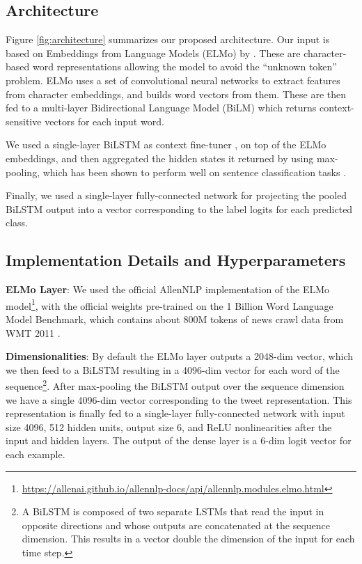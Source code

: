 \documentclass[11pt,a4paper]{article}
\begin{document}
\subsection{Architecture}

Figure \ref{fig:architecture} summarizes our proposed architecture. Our input is based on Embeddings from Language Models (ELMo) by \citet{peters2018deep}. These are character-based word representations allowing the model to avoid the ``unknown token'' problem. ELMo uses a set of convolutional neural networks to extract features from character embeddings, and builds word vectors from them. These are then fed to a multi-layer Bidirectional Language Model (BiLM) which returns context-sensitive vectors for each input word. 

We used a single-layer BiLSTM as context fine-tuner \cite{graves2005framewise, graves2013speech}, on top of the ELMo embeddings, and then aggregated the hidden states it returned by using max-pooling, which has been shown to perform well on sentence classification tasks \cite{conneau2017supervised}.

Finally, we used a single-layer fully-connected network for projecting the pooled BiLSTM output into a vector corresponding to the label logits for each predicted class.

\subsection{Implementation Details and Hyperparameters}

\hspace{\parindent} \textbf{ELMo Layer}: We used the official AllenNLP implementation of the ELMo model\footnote{\tiny\url{https://allenai.github.io/allennlp-docs/api/allennlp.modules.elmo.html}}, with the official weights pre-trained on the 1 Billion Word Language Model Benchmark, which contains about 800M tokens of news crawl data from WMT 2011 \cite{Chelba2014}.

\textbf{Dimensionalities}: By default the ELMo layer outputs a 2048-dim vector, which we then feed to a BiLSTM resulting in a 4096-dim vector for each word of the sequence\footnote{A BiLSTM is composed of two separate LSTMs that read the input in opposite directions and whose outputs are concatenated at the sequence dimension. This results in a vector double the dimension of the input for each time step.}. After max-pooling the BiLSTM output over the sequence dimension we have a single 4096-dim vector corresponding to the tweet representation. This representation is finally fed to a single-layer fully-connected network with input size 4096, 512 hidden units, output size 6, and ReLU nonlinearities after the input and hidden layers. The output of the dense layer is a 6-dim logit vector for each example.
\end{document}
